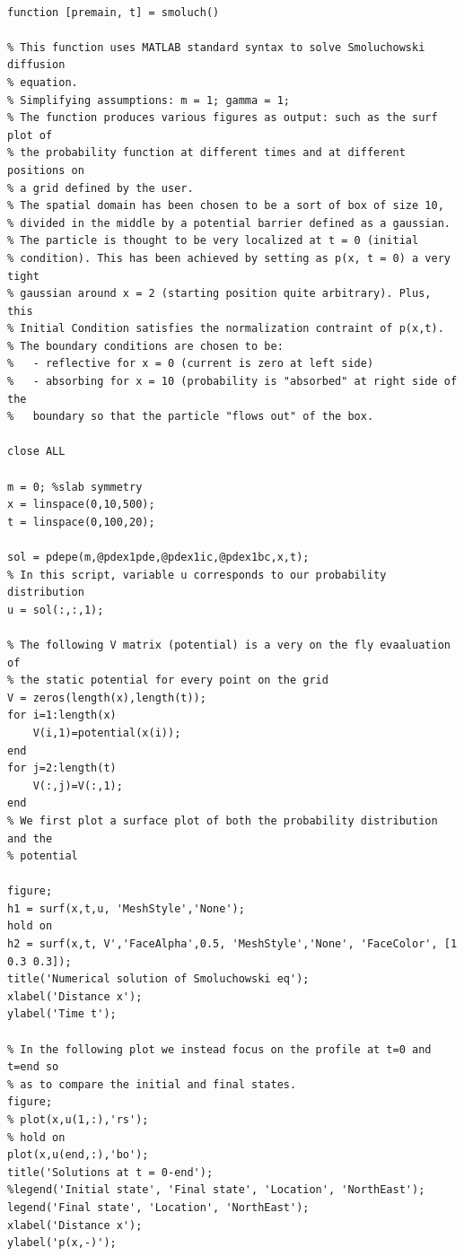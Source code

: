 \documentclass[11pt,letterpaper]{article}
\begin{document}
\begin{lstlisting}

function [premain, t] = smoluch()

% This function uses MATLAB standard syntax to solve Smoluchowski diffusion
% equation.
% Simplifying assumptions: m = 1; gamma = 1;
% The function produces various figures as output: such as the surf plot of
% the probability function at different times and at different positions on
% a grid defined by the user. 
% The spatial domain has been chosen to be a sort of box of size 10,
% divided in the middle by a potential barrier defined as a gaussian. 
% The particle is thought to be very localized at t = 0 (initial
% condition). This has been achieved by setting as p(x, t = 0) a very tight
% gaussian around x = 2 (starting position quite arbitrary). Plus, this
% Initial Condition satisfies the normalization contraint of p(x,t).
% The boundary conditions are chosen to be:
%   - reflective for x = 0 (current is zero at left side)
%   - absorbing for x = 10 (probability is "absorbed" at right side of the
%   boundary so that the particle "flows out" of the box.

close ALL

m = 0; %slab symmetry
x = linspace(0,10,500);
t = linspace(0,100,20);

sol = pdepe(m,@pdex1pde,@pdex1ic,@pdex1bc,x,t);
% In this script, variable u corresponds to our probability distribution
u = sol(:,:,1);

% The following V matrix (potential) is a very on the fly evaaluation of
% the static potential for every point on the grid
V = zeros(length(x),length(t));
for i=1:length(x)
    V(i,1)=potential(x(i));
end
for j=2:length(t)
    V(:,j)=V(:,1);
end
% We first plot a surface plot of both the probability distribution and the
% potential

figure;
h1 = surf(x,t,u, 'MeshStyle','None');
hold on
h2 = surf(x,t, V','FaceAlpha',0.5, 'MeshStyle','None', 'FaceColor', [1 0.3 0.3]);
title('Numerical solution of Smoluchowski eq');
xlabel('Distance x');
ylabel('Time t');

% In the following plot we instead focus on the profile at t=0 and t=end so
% as to compare the initial and final states.
figure;
% plot(x,u(1,:),'rs');
% hold on
plot(x,u(end,:),'bo');
title('Solutions at t = 0-end');
%legend('Initial state', 'Final state', 'Location', 'NorthEast');
legend('Final state', 'Location', 'NorthEast');
xlabel('Distance x');
ylabel('p(x,-)');


\end{lstlisting}
\end{document}
